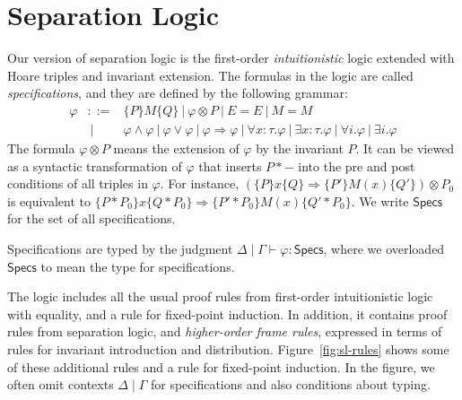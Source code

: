 \documentclass{LMCS}
\newcommand{\Spec}{\mathsf{Specs}}
\newcommand{\mtri}[3]{\{{#1}\}{#2}\{{#3}\}}
\begin{document}
\section{Separation Logic}
\label{sec:separation-logic}
Our version of separation logic is the first-order 
{\em intuitionistic\/} logic extended with Hoare triples 
and invariant extension.
The formulas in the logic are called {\em specifications},
and they are defined by the following grammar:
{
$$
\begin{array}{rcl}
\varphi
  & ::= & \mtri{P}{M}{Q}
     \ | \ \varphi \otimes P
     \ | \ E = E
     \ | \ M = M 
\\
  & \ | \ & \varphi \wedge \varphi
    \ | \   \varphi \vee \varphi
    \ | \   \varphi \Rightarrow \varphi
    \ | \   \forall x\colon \tau. \varphi 
    \ | \   \exists x\colon \tau. \varphi
    \ | \   \forall i. \varphi 
    \ | \   \exists i. \varphi
\end{array}
$$
}
The formula $\varphi \otimes P$ means
the extension of $\varphi$ by the invariant $P$.
It can be viewed as 
a syntactic transformation of $\varphi$ that 
inserts $P*-$ into the pre and post conditions of all triples 
in $\varphi$.  For instance, 
$(\mtri{P}{x}{Q} \Rightarrow \mtri{P'}{M(x)}{Q'})  \otimes P_0$ is 
equivalent to 
$\mtri{P*P_0}{x}{Q*P_0} \Rightarrow \mtri{P'*P_0}{M(x)}{Q'*P_0}$.
We write $\Spec$ for the set of all specifications.

Specifications are typed by the judgment 
$\Delta \mid \Gamma \vdash \varphi : \Spec$, where we
overloaded $\Spec$ to mean the type for specifications.

The logic includes all the usual proof rules from first-order
intuitionistic logic with equality, and a rule for fixed-point induction.
In addition, it contains proof rules from separation logic, and
\emph{higher-order frame rules}, expressed in terms of rules for invariant
introduction and distribution. Figure~\ref{fig:sl-rules} shows some of
these additional rules and a rule for fixed-point 
induction. In the figure, we often omit contexts $\Delta \mid
\Gamma$ for specifications and also conditions about typing.
\end{document}
